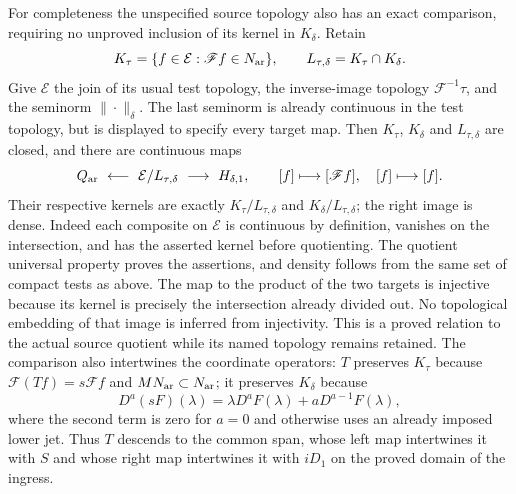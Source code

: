 For completeness the unspecified source topology also has an exact
comparison, requiring no unproved inclusion of its kernel in
$K_\delta$. Retain
\[
 K_\tau=\{f\in\mathcal E:\mathscr Ff\in N_{\rm ar}\},
 \qquad L_{\tau,\delta}=K_\tau\cap K_\delta.
\]
Give $\mathcal E$ the join of its usual test topology, the
inverse-image topology $\mathscr F^{-1}\tau$, and the seminorm
$\|\cdot\|_\delta$. The last seminorm is already continuous in
the test topology, but is displayed to specify every target map.
Then $K_\tau$, $K_\delta$ and $L_{\tau,\delta}$ are closed, and
there are continuous maps
\begin{equation}\label{eq:cq-sobolev-source-span}
 Q_{\rm ar}\ \longleftarrow\
 \mathcal E/L_{\tau,\delta}
 \ \longrightarrow\ H_{\delta,1},
 \qquad
 [f]\longmapsto[\mathscr Ff],\quad [f]\longmapsto[f].
\end{equation}
Their respective kernels are exactly
$K_\tau/L_{\tau,\delta}$ and $K_\delta/L_{\tau,\delta}$;
the right image is dense. Indeed each composite on $\mathcal E$
is continuous by definition, vanishes on the intersection, and
has the asserted kernel before quotienting. The quotient universal
property proves the assertions, and density follows from the same
set of compact tests as above. The map to the product of the two
targets is injective because its kernel is precisely the
intersection already divided out. No topological embedding of that
image is inferred from injectivity. This is a proved relation to
the actual source quotient while its named topology remains retained.
The comparison also intertwines the coordinate operators: $T$
preserves $K_\tau$ because $\mathscr F(Tf)=s\mathscr Ff$ and
$MN_{\rm ar}\subset N_{\rm ar}$; it preserves $K_\delta$ because
\[
 D^a(sF)(\lambda)=\lambda D^aF(\lambda)
                              +aD^{a-1}F(\lambda),
\]
where the second term is zero for $a=0$ and otherwise uses an
already imposed lower jet. Thus $T$ descends to the common span,
whose left map intertwines it with $S$ and whose right map
intertwines it with $iD_1$ on the proved domain of the ingress.


